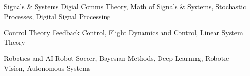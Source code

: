 

\begin{cvskills}

  \cvskill
    {Signals \& Systems} %
    {Digial Comms Theory, Math of Signals \& Systems, Stochastic Processes, Digital Signal Processing} %

  \cvskill
    {Control Theory} %
    {Feedback Control, Flight Dynamics and Control, Linear System Theory} %

  \cvskill
    {Robotics and AI} %
    {Robot Soccer, Bayesian Methods, Deep Learning, Robotic Vision, Autonomous Systems} %

\end{cvskills}
